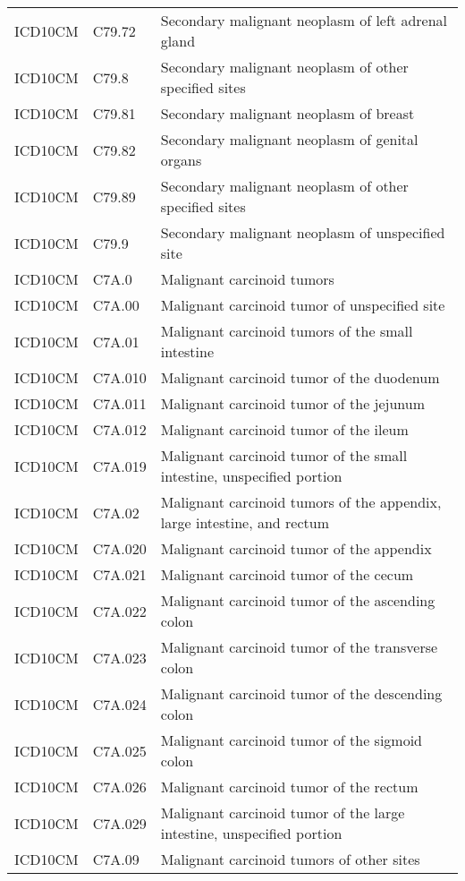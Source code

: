 \begin{longtable}{p{}p{}p{}}
  ICD10CM & C79.72 & Secondary malignant neoplasm of left adrenal gland \\ 
  ICD10CM & C79.8 & Secondary malignant neoplasm of other specified sites \\ 
  ICD10CM & C79.81 & Secondary malignant neoplasm of breast \\ 
  ICD10CM & C79.82 & Secondary malignant neoplasm of genital organs \\ 
  ICD10CM & C79.89 & Secondary malignant neoplasm of other specified sites \\ 
  ICD10CM & C79.9 & Secondary malignant neoplasm of unspecified site \\ 
  ICD10CM & C7A.0 & Malignant carcinoid tumors \\ 
  ICD10CM & C7A.00 & Malignant carcinoid tumor of unspecified site \\ 
  ICD10CM & C7A.01 & Malignant carcinoid tumors of the small intestine \\ 
  ICD10CM & C7A.010 & Malignant carcinoid tumor of the duodenum \\ 
  ICD10CM & C7A.011 & Malignant carcinoid tumor of the jejunum \\ 
  ICD10CM & C7A.012 & Malignant carcinoid tumor of the ileum \\ 
  ICD10CM & C7A.019 & Malignant carcinoid tumor of the small intestine, unspecified portion \\ 
  ICD10CM & C7A.02 & Malignant carcinoid tumors of the appendix, large intestine, and rectum \\ 
  ICD10CM & C7A.020 & Malignant carcinoid tumor of the appendix \\ 
  ICD10CM & C7A.021 & Malignant carcinoid tumor of the cecum \\ 
  ICD10CM & C7A.022 & Malignant carcinoid tumor of the ascending colon \\ 
  ICD10CM & C7A.023 & Malignant carcinoid tumor of the transverse colon \\ 
  ICD10CM & C7A.024 & Malignant carcinoid tumor of the descending colon \\ 
  ICD10CM & C7A.025 & Malignant carcinoid tumor of the sigmoid colon \\ 
  ICD10CM & C7A.026 & Malignant carcinoid tumor of the rectum \\ 
  ICD10CM & C7A.029 & Malignant carcinoid tumor of the large intestine, unspecified portion \\ 
  ICD10CM & C7A.09 & Malignant carcinoid tumors of other sites \\ 

\end{longtable}
